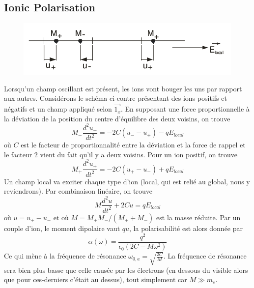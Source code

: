 \subsection{Ionic Polarisation}
	\begin{figure}
	\includegraphics[scale=0.4]{ch3/image1.png}
	\end{figure}
Lorsqu'un champ oscillant est présent, les ions vont bouger les uns par rapport aux autres. Considérons le
schéma ci-contre présentant des ions positifs et négatifs et un champ appliqué selon $\vec{1_x}$. En supposant
une force proportionnelle à la déviation de la position du centre d'équilibre des deux voisins, on trouve
\begin{equation}
M_-\dfrac{d^2u_-}{dt^2} = -2C(u_--u_+)-qE_{local}
\end{equation}
où $C$ est le facteur de proportionnalité entre la déviation et la force de rappel et le facteur 2 vient du fait
qu'il y a deux voisins. Pour un ion positif, on trouve 
\begin{equation}
M_+\dfrac{d^2u_+}{dt^2} = -2C(u_+-u_-)+qE_{local}
\end{equation}
Un champ local va exciter chaque type d'ion (local, qui est relié au global, nous y reviendrons). Par combinaison
linéaire, on trouve
\begin{equation}
M\dfrac{d^2u}{dt^2}+2Cu=qE_{local}
\end{equation}
où $u=u_+-u_-$ et où $M= M_+M_-/(M_++M_-)$ est la masse réduite. Par un couple d'ion, le moment dipolaire vaut
$qu$, la polarisabilité est alors donnée par 
\begin{equation}
\alpha(\omega) = \dfrac{q^2}{\epsilon_0(2C-M\omega^2)}
\end{equation}
Ce qui mène à la fréquence de résonance $\omega_{0,a} = \sqrt{\frac{2C}{M}}$. La fréquence de résonance sera
bien plus basse que celle causée par les électrons (en dessous du visible alors que pour ces-derniers c'était
au dessus), tout simplement car $M \gg m_e$.

